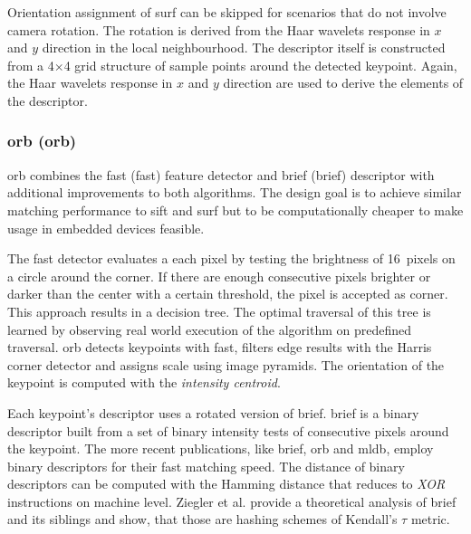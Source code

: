 Orientation assignment of \acrshort{surf} can be skipped for scenarios that do not involve camera rotation.
The rotation is derived from the Haar wavelets\cite{haar_1911} response in $x$ and $y$ direction in the local neighbourhood.
The descriptor itself is constructed from a 4$\times$4 grid structure of sample points around the detected keypoint.
Again, the Haar wavelets response in $x$ and $y$ direction are used to derive the elements of the descriptor.

\subsubsection{\acrshort{orb} (\acrlong{orb})}

\acrshort{orb}\cite{rublee_iccv11} combines the \acrshort{fast}\cite{rosten_eccv06} (\acrlong{fast}) feature detector and \acrshort{brief}\cite{calonder_eccv10} (\acrlong{brief}) descriptor with additional improvements to both algorithms.
The design goal is to achieve similar matching performance to \acrshort{sift} and \acrshort{surf} but to be computationally cheaper to make usage in embedded devices feasible.

The \acrshort{fast} detector evaluates a each pixel by testing the brightness of 16~pixels on a circle around the corner.
If there are enough consecutive pixels brighter or darker than the center with a certain threshold, the pixel is accepted as corner.
This approach results in a decision tree.
The optimal traversal of this tree is learned by observing real world execution of the algorithm on predefined traversal.
\acrshort{orb} detects keypoints with \acrshort{fast}, filters edge results with the Harris corner detector\cite{harris_1988} and assigns scale using image pyramids.
The orientation of the keypoint is computed with the \emph{intensity centroid}\cite{rosin_cviu99}.

Each keypoint's descriptor uses a rotated version of \acrshort{brief}.
\acrshort{brief} is a binary descriptor built from a set of binary intensity tests of consecutive pixels around the keypoint.
The more recent publications, like \acrshort{brief}, \acrshort{orb} and \acrshort{mldb}, employ binary descriptors for their fast matching speed.
The distance of binary descriptors can be computed with the Hamming distance that reduces to \emph{XOR} instructions on machine level.
Ziegler et al.\cite{ziegler_anips2012} provide a theoretical analysis of \acrshort{brief} and its siblings and show, that those are hashing schemes of Kendall's $\tau$ metric\cite{kendall_1938}.

